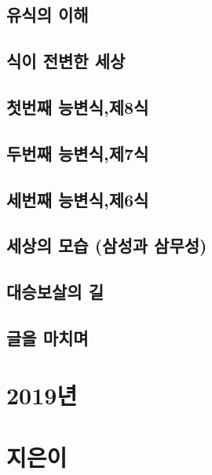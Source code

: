 \documentclass[12pt, a4paper, oneside]{book}
\begin{document}
%										
	\chapter{ 유식의 이해 }
	\chapter{ 식이 전변한 세상 }
	\chapter{ 첫번째 능변식,제8식 }
	\chapter{ 두번째 능변식,제7식 }
	\chapter{ 세번째 능변식,제6식 }
	\chapter{ 세상의 모습 (삼성과 삼무성) }
	\chapter{ 대승보살의 길 }
	\chapter{ 글을 마치며}




	\part{ 2019년  }
	\noptcrule
	\parttoc				



	\part{ 지은이  }
	\noptcrule
	\parttoc				





\end{document}
